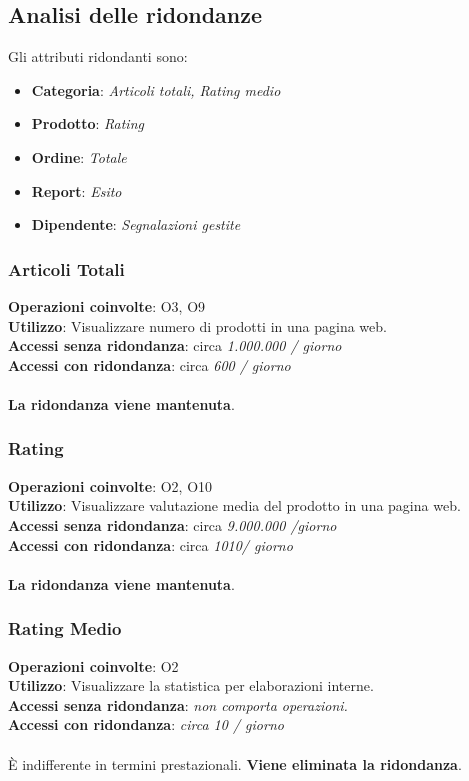 \subsection{Analisi delle ridondanze}

Gli attributi ridondanti sono:
\begin{itemize}
    \item \textbf{Categoria}: \textit{Articoli totali, Rating medio}
    \item \textbf{Prodotto}: \textit{Rating}
    \item \textbf{Ordine}: \textit{Totale}
    \item \textbf{Report}: \textit{Esito}
    \item \textbf{Dipendente}: \textit{Segnalazioni gestite}
\end{itemize}

\subsubsection{Articoli Totali}
\textbf{Operazioni coinvolte}: O3, O9\\
\textbf{Utilizzo}: Visualizzare numero di prodotti in una pagina web.\\
\textbf{Accessi senza ridondanza}: circa \textit{1.000.000 / giorno}\\
\textbf{Accessi con ridondanza}: circa \textit{600 / giorno}\\\\
\textbf{La ridondanza viene mantenuta}.

\subsubsection{Rating}
\textbf{Operazioni coinvolte}: O2, O10  \\
\textbf{Utilizzo}: Visualizzare valutazione media del prodotto in una pagina web.\\
\textbf{Accessi senza ridondanza}: circa \textit{9.000.000 /giorno}\\
\textbf{Accessi con ridondanza}: circa \textit{1010/ giorno}\\\\
\textbf{La ridondanza viene mantenuta}.

\subsubsection{Rating Medio}
\textbf{Operazioni coinvolte}: O2\\
\textbf{Utilizzo}: Visualizzare la statistica per elaborazioni interne.\\
\textbf{Accessi senza ridondanza}: \textit{non comporta operazioni.}\\
\textbf{Accessi con ridondanza}: \textit{circa 10 / giorno}\\\\
È indifferente in termini prestazionali. \textbf{Viene eliminata la ridondanza}.

